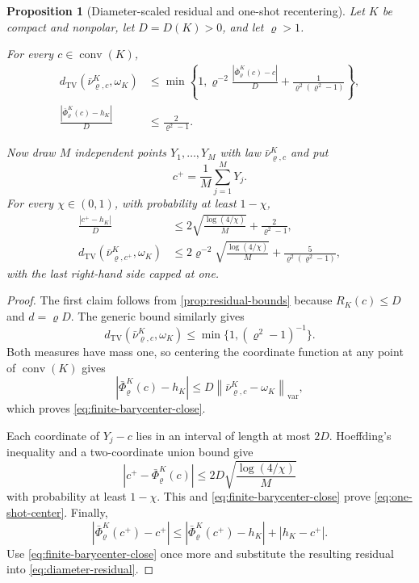 \documentclass[11pt]{article}
\theoremstyle{mainthm}
\newtheorem{proposition}[proposition]{Proposition}
\theoremstyle{definition}
\theoremstyle{remark}
\newcommand{\dTV}{d_{\mathrm{TV}}}
\newcommand{\conv}{\operatorname{conv}}
\newcommand{\norm}[1]{\left\lVert #1\right\rVert}
\begin{document}
\begin{proposition}[Diameter-scaled residual and one-shot recentering]
\label{prop:one-shot}
Let $K$ be compact and nonpolar, let $D=D(K)>0$, and let $\varrho>1$.

For every $c\in\conv(K)$,
\begin{align}
  \dTV\!\left(\bar\nu_{\varrho,c}^{K},\omega_K\right)
  &\le
  \min\left\{1,
  \varrho^{-2}\frac{|\bar\Phi_{\varrho}^{K}(c)-c|}{D}
  +\frac{1}{\varrho^2(\varrho^2-1)}\right\},
  \label{eq:diameter-residual}
  \\
  \frac{|\bar\Phi_{\varrho}^{K}(c)-h_K|}{D}
  &\le \frac{2}{\varrho^2-1}.
  \label{eq:finite-barycenter-close}
\end{align}

Now draw $M$ independent points $Y_1,\ldots,Y_M$ with law
$\bar\nu_{\varrho,c}^{K}$ and put
\[
  c^+=\frac1M\sum_{j=1}^{M}Y_j.
\]
For every $\chi\in(0,1)$, with probability at least $1-\chi$,
\begin{align}
  \frac{|c^+-h_K|}{D}
  &\le
  2\sqrt{\frac{\log(4/\chi)}{M}}
  +\frac{2}{\varrho^2-1},
  \label{eq:one-shot-center}
  \\
  \dTV\!\left(\bar\nu_{\varrho,c^+}^{K},\omega_K\right)
  &\le
  2\varrho^{-2}\sqrt{\frac{\log(4/\chi)}{M}}
  +\frac{5}{\varrho^2(\varrho^2-1)},
  \label{eq:one-shot-law}
\end{align}
with the last right-hand side capped at one.
\end{proposition}

\begin{proof}
The first claim follows from \cref{prop:residual-bounds} because
$R_K(c)\le D$ and $d=\varrho D$. The generic bound similarly gives
\[
  \dTV(\bar\nu_{\varrho,c}^{K},\omega_K)
  \le \min\{1,(\varrho^2-1)^{-1}\}.
\]
Both measures have mass one, so centering the coordinate function at any point of $\conv(K)$ gives
\[
  |\bar\Phi_{\varrho}^{K}(c)-h_K|
  \le D\norm{\bar\nu_{\varrho,c}^{K}-\omega_K}_{\mathrm{var}},
\]
which proves \eqref{eq:finite-barycenter-close}.

Each coordinate of $Y_j-c$ lies in an interval of length at most $2D$.
Hoeffding's inequality and a two-coordinate union bound give
\[
  |c^+-\bar\Phi_{\varrho}^{K}(c)|
  \le 2D\sqrt{\frac{\log(4/\chi)}{M}}
\]
with probability at least $1-\chi$. This and
\eqref{eq:finite-barycenter-close} prove \eqref{eq:one-shot-center}.
Finally,
\[
  |\bar\Phi_{\varrho}^{K}(c^+)-c^+|
  \le
  |\bar\Phi_{\varrho}^{K}(c^+)-h_K|+|h_K-c^+|.
\]
Use \eqref{eq:finite-barycenter-close} once more and substitute the
resulting residual into \eqref{eq:diameter-residual}.
\end{proof}
\end{document}

